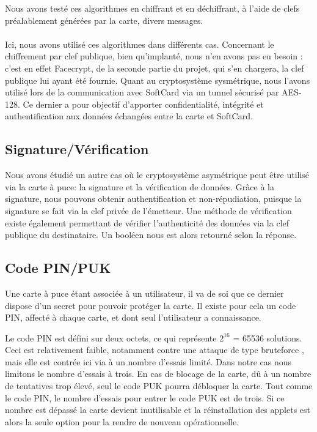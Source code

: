 \documentclass[a4paper,11pt,french]{article}
\begin{document}
Nous avons testé ces algorithmes en chiffrant et en déchiffrant, à l'aide de 
clefs préalablement générées par la carte, divers messages. 

\paragraph{}
Ici, nous avons utilisé ces algorithmes dans différents cas. Concernant
le chiffrement par clef publique, bien qu'implanté, nous n'en avons pas eu 
besoin : c'est en effet Facecrypt, de la seconde partie du projet, qui s'en 
chargera, la clef publique lui ayant été fournie. Quant au cryptosystème 
sysmétrique, nous l'avons utilisé lors de la communication avec SoftCard
via un \og{}tunnel \fg{} sécurisé par AES-128. Ce dernier a pour objectif d'apporter 
confidentialité, intégrité et authentification aux données échangées entre la 
carte et SoftCard.

\subsection{Signature/Vérification}
Nous avons étudié un autre cas où le cryptosystème asymétrique peut être utilisé
via la carte à puce: la signature et la vérification de données. Grâce à la 
signature, nous pouvons obtenir authentification et non-répudiation, puisque la
signature se fait via la clef privée de l'émetteur. Une méthode de vérification
existe également permettant de vérifier l'authenticité des données via la clef 
publique du destinataire. Un booléen nous est alors retourné selon la réponse.

\label{CodePIN}
\subsection{Code PIN/PUK}
Une carte à puce étant associée à un utilisateur, il va de soi que ce dernier 
dispose d'un secret pour pouvoir protéger la carte. Il existe pour cela un code 
PIN, affecté à chaque carte, et dont seul l'utilisateur a connaissance.

Le code PIN est défini sur deux octets, ce qui représente $2^{16}$ = 65536 solutions.
Ceci est relativement faible, notamment contre une attaque de type 
\og{}bruteforce \fg{}, mais elle est contrée ici via à un nombre d'essais limité.
Dans notre cas nous limitons le nombre d'essais à trois. En cas de blocage de la
carte, dû à un nombre de tentatives trop élevé, seul le code PUK pourra 
débloquer la carte. Tout comme le code PIN, le nombre d'essais pour entrer le 
code PUK est de trois. Si ce nombre est dépassé la carte devient inutilisable et
la réinstallation des applets est alors la seule option pour la rendre
de nouveau opérationnelle.
\end{document}

